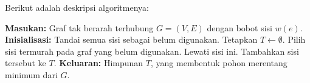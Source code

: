 Berikut adalah deskripsi algoritmenya:
\begin{algorithm}[H]
\caption{Algoritme Kruskal (Versi Deskriptif)}
\begin{algorithmic}[1]
\State \textbf{Masukan:} Graf tak berarah terhubung \( G = (V, E) \) dengan bobot sisi \( w(e) \).
\State \textbf{Inisialisasi:} Tandai semua sisi sebagai belum digunakan. Tetapkan \( T \gets \emptyset \).
\Repeat
  \State Pilih sisi termurah pada graf yang belum digunakan.
    \State Lewati sisi ini.
  \Else
    \State Tambahkan sisi tersebut ke \( T \).
  \EndIf
{}
\State \textbf{Keluaran:} Himpunan \( T \), yang membentuk pohon merentang minimum dari \( G \).
\end{algorithmic}
\end{algorithm}

